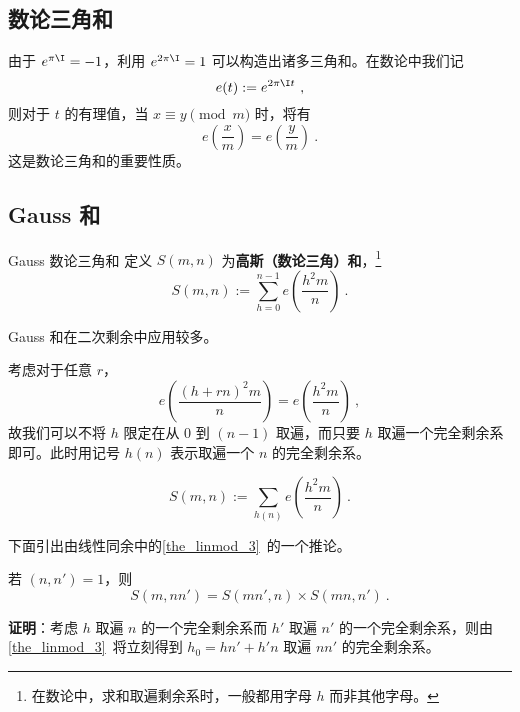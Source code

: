 

\subsection{数论三角和}
由于 $e^{\pi \I} = -1$，利用 $e^{2\pi \I} = 1$ 可以构造出诸多三角和。在数论中我们记
\begin{equation}
e(t) := e^{2\pi \I t} ~,
\end{equation}
则对于 $t$ 的有理值，当 $x \equiv y \pmod m$ 时，将有
\begin{equation}
e\left(\frac{x}{m}\right) = e\left(\frac{y}{m}\right) ~.
\end{equation}
这是数论三角和的重要性质。

\subsection{Gauss 和}
\begin{definition}{Gauss 数论三角和}
定义 $S(m, n)$ 为\textbf{高斯（数论三角）和}，\footnote{在数论中，求和取遍剩余系时，一般都用字母 $h$ 而非其他字母。}
\begin{equation}
S(m, n) := \sum_{h = 0}^{n-1} e\left(\frac{h^2m}{n}\right) ~.
\end{equation}

\end{definition}
Gauss 和在二次剩余中应用较多。

考虑对于任意 $r$，
\begin{equation}
e\left(\frac{(h + rn)^2m}{n}\right) = e\left(\frac{h^2m}{n}\right) ~,
\end{equation}
故我们可以不将 $h$ 限定在从 $0$ 到 $(n-1)$ 取遍，而只要 $h$ 取遍一个完全剩余系即可。此时用记号 $h(n)$ 表示取遍一个 $n$ 的完全剩余系。
\begin{corollary}{}
\begin{equation}
S(m, n) := \sum_{h(n)} e\left(\frac{h^2 m}{n}\right) ~.
\end{equation}

\end{corollary}

下面引出由线性同余中的\autoref{the_linmod_3}~的一个推论。
\begin{corollary}{}
若 $(n, n') = 1$，则
\begin{equation}
S(m, nn') = S(mn', n) \times S(mn, n') ~.
\end{equation}

\end{corollary}
\textbf{证明}：考虑 $h$ 取遍 $n$ 的一个完全剩余系而 $h'$ 取遍 $n'$ 的一个完全剩余系，则由\autoref{the_linmod_3}~将立刻得到 $h_0 = hn' +h'n$ 取遍 $nn'$ 的完全剩余系。